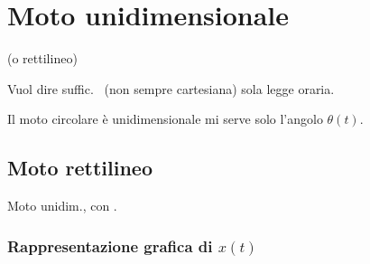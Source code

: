 \documentclass[11pt,a4paper,openany]{report}
\begin{document}
\chapter{Moto unidimensionale}

(o rettilineo)

Vuol dire \implica suffic.\  (non sempre cartesiana)
 sola legge oraria.

\begin{esempio}{}
Il moto circolare è unidimensionale \implica mi serve solo l'angolo $\theta(t)$.
\end{esempio}

\nonewpage
\section{Moto rettilineo}
 \implica Moto unidim., con .

\begin{disegno}
\end{disegno}

\subsection{Rappresentazione grafica di \texorpdfstring{$x(t)$}{x(t)}}
\end{document}
